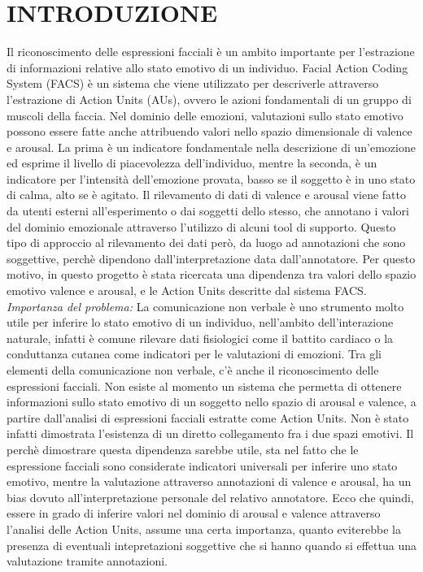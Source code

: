 \documentclass[10pt,journal,compsoc]{IEEEtran}
\begin{document}
\section{INTRODUZIONE}\label{sec:introduzione}
\IEEEPARstart{}
Il riconoscimento delle espressioni facciali è un ambito importante per l'estrazione di informazioni relative allo stato emotivo di un individuo. Facial Action Coding System (FACS) è un sistema che viene utilizzato per descriverle attraverso l'estrazione di Action Units (AUs), ovvero le azioni fondamentali di un gruppo di muscoli della faccia. Nel dominio delle emozioni,  valutazioni sullo stato emotivo possono essere fatte anche attribuendo valori nello spazio dimensionale di valence e arousal. La prima è un indicatore fondamentale nella descrizione di un'emozione ed esprime il livello di piacevolezza dell’individuo, mentre la seconda, è un indicatore per l’intensità dell'emozione provata, basso se il soggetto è in uno stato di calma, alto se è agitato\cite{ellsworth}. Il rilevamento di dati di valence e arousal viene fatto da utenti esterni all’esperimento o dai soggetti dello stesso, che annotano i valori del dominio emozionale attraverso l'utilizzo di alcuni tool di supporto. Questo tipo di approccio al rilevamento dei dati però, da luogo ad annotazioni che sono soggettive, perchè dipendono dall'interpretazione data dall'annotatore. Per questo motivo, in questo progetto è stata ricercata una dipendenza tra valori dello spazio emotivo valence e arousal, e le Action Units descritte dal sistema FACS.\\
\emph{Importanza del problema:}
La comunicazione non verbale è uno strumento molto utile per inferire lo stato emotivo di un individuo, nell'ambito dell'interazione naturale, infatti è comune rilevare dati fisiologici come il battito cardiaco o la conduttanza cutanea come indicatori per le valutazioni di emozioni. Tra gli elementi della comunicazione non verbale, c'è anche il riconoscimento delle espressioni facciali. Non esiste al momento un sistema che permetta di ottenere informazioni sullo stato emotivo di un soggetto nello spazio di arousal e valence, a partire dall'analisi di espressioni facciali estratte come Action Units. Non è stato infatti dimostrata l'esistenza di un diretto collegamento fra i due spazi emotivi. Il perchè dimostrare questa dipendenza sarebbe utile, sta nel fatto che le  espressione facciali  sono considerate indicatori universali per inferire uno stato emotivo, mentre la valutazione attraverso annotazioni di valence e arousal, ha un bias dovuto all'interpretazione personale del relativo annotatore. Ecco che quindi, essere in grado di inferire valori nel dominio di arousal e valence attraverso l'analisi delle Action Units, assume una certa importanza, quanto eviterebbe la presenza di eventuali intepretazioni soggettive che si hanno quando si effettua una valutazione tramite annotazioni.\\
\end{document}

